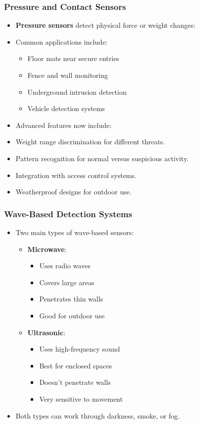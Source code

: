 \documentclass{beamer}
\begin{document}
\begin{frame}
    \frametitle{Pressure and Contact Sensors}
    \begin{itemize}
        \item \textbf{Pressure sensors} detect physical force or weight changes:
        \item Common applications include:
            \begin{itemize}
                \item Floor mats near secure entries
                \item Fence and wall monitoring
                \item Underground intrusion detection
                \item Vehicle detection systems
            \end{itemize}
        \item Advanced features now include:
        \item Weight range discrimination for different threats.
        \item Pattern recognition for normal versus suspicious activity.
        \item Integration with access control systems.
        \item Weatherproof designs for outdoor use.
    \end{itemize}
\end{frame}

\begin{frame}
    \frametitle{Wave-Based Detection Systems}
    \begin{itemize}
        \item Two main types of wave-based sensors:
            \begin{itemize}
                \item \textbf{Microwave}:
                    \begin{itemize}
                        \item Uses radio waves
                        \item Covers large areas
                        \item Penetrates thin walls
                        \item Good for outdoor use
                    \end{itemize}
                \item \textbf{Ultrasonic}:
                    \begin{itemize}
                        \item Uses high-frequency sound
                        \item Best for enclosed spaces
                        \item Doesn't penetrate walls
                        \item Very sensitive to movement
                    \end{itemize}
            \end{itemize}
        \item Both types can work through darkness, smoke, or fog.
    \end{itemize}
\end{frame}
\end{document}
